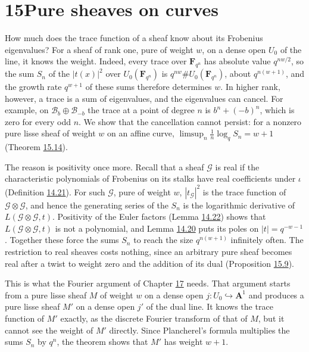 \documentclass[11pt]{article}
\begin{document}
\section*{\texorpdfstring{15\quad Pure sheaves on curves}{15 Pure sheaves on curves}}
\label{bp122}%
\label{bp123}%
How much does the trace function of a sheaf know about its Frobenius eigenvalues? For a sheaf of rank one, pure of weight \(w\), on a dense open \(U_0\) of the line, it knows the weight. Indeed, every trace over \(\mathbf F_{q^n}\) has absolute value \(q^{nw/2}\), so the sum \(S_n\) of the \(|t(x)|^2\) over \(U_0(\mathbf F_{q^n})\) is \(q^{nw}\#U_0(\mathbf F_{q^n})\), about \(q^{n(w+1)}\), and the growth rate \(q^{w+1}\) of these sums therefore determines \(w\). In higher rank, however, a trace is a sum of eigenvalues, and the eigenvalues can cancel. For example, on \(\mathcal B_b\oplus\mathcal B_{-b}\) the trace at a point of degree \(n\) is \(b^n+(-b)^n\), which is zero for every odd \(n\). We show that the cancellation cannot persist: for a nonzero pure lisse sheaf of weight \(w\) on an affine curve, \(\limsup_n\frac1n\log_qS_n=w+1\) (Theorem \hyperref[bp162]{15.14}).

The reason is positivity once more. Recall that a sheaf \(\mathcal G\) is real if the characteristic polynomials of Frobenius on its stalks have real coefficients under \(\iota\) (Definition \hyperref[bp107]{14.21}). For such \(\mathcal G\), pure of weight \(w\), \(|t_{\mathcal G}|^2\) is the trace function of \(\mathcal G\otimes\mathcal G\), and hence the generating series of the \(S_n\) is the logarithmic derivative of \(L(\mathcal G\otimes\mathcal G,t)\). Positivity of the Euler factors (Lemma \hyperref[bp109]{14.22}) shows that \(L(\mathcal G\otimes\mathcal G,t)\) is not a polynomial, and Lemma \hyperref[bp104]{14.20} puts its poles on \(|t|=q^{-w-1}\). Together these force the sums \(S_n\) to reach the size \(q^{n(w+1)}\) infinitely often. The restriction to real sheaves costs nothing, since an arbitrary pure sheaf becomes real after a twist to weight zero and the addition of its dual (Proposition \hyperref[bp148]{15.9}).

This is what the Fourier argument of Chapter \hyperref[bp223]{17} needs. That argument starts from a pure lisse sheaf \(M\) of weight \(w\) on a dense open \(j:U_0\hookrightarrow\mathbf A^1\) and produces a pure lisse sheaf \(M'\) on a dense open \(j'\) of the dual line. It knows the trace function of \(M'\) exactly, as the discrete Fourier transform of that of \(M\), but it cannot see the weight of \(M'\) directly. Since Plancherel's formula multiplies the sums \(S_n\) by \(q^n\), the theorem shows that \(M'\) has weight \(w+1\).
\end{document}
